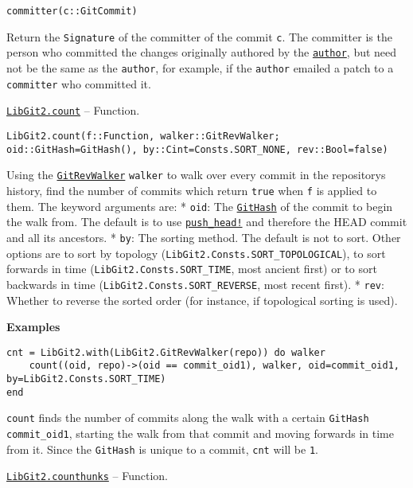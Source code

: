 \begin{adjustwidth}{2em}{0pt}


\begin{verbatim}
committer(c::GitCommit)
\end{verbatim}

Return the \texttt{Signature} of the committer of the commit \texttt{c}. The committer is the person who committed the changes originally authored by the \hyperlink{7024880280540966409}{\texttt{author}}, but need not be the same as the \texttt{author}, for example, if the \texttt{author} emailed a patch to a \texttt{committer} who committed it.



\end{adjustwidth}
\hypertarget{3202007276139600178}{} 
\hyperlink{3202007276139600178}{\texttt{LibGit2.count}}  -- {Function.}

\begin{adjustwidth}{2em}{0pt}


\begin{verbatim}
LibGit2.count(f::Function, walker::GitRevWalker; oid::GitHash=GitHash(), by::Cint=Consts.SORT_NONE, rev::Bool=false)
\end{verbatim}

Using the \hyperlink{7800294839307043628}{\texttt{GitRevWalker}} \texttt{walker} to {\textquotedbl}walk{\textquotedbl} over every commit in the repository{\textquotesingle}s history, find the number of commits which return \texttt{true} when \texttt{f} is applied to them. The keyword arguments are:     * \texttt{oid}: The \hyperlink{202290709580230708}{\texttt{GitHash}} of the commit to begin the walk from. The default is to use       \hyperlink{9792433728015067335}{\texttt{push\_head!}} and therefore the HEAD commit and all its ancestors.     * \texttt{by}: The sorting method. The default is not to sort. Other options are to sort by       topology (\texttt{LibGit2.Consts.SORT\_TOPOLOGICAL}), to sort forwards in time       (\texttt{LibGit2.Consts.SORT\_TIME}, most ancient first) or to sort backwards in time       (\texttt{LibGit2.Consts.SORT\_REVERSE}, most recent first).     * \texttt{rev}: Whether to reverse the sorted order (for instance, if topological sorting is used).

\textbf{Examples}


\begin{verbatim}
cnt = LibGit2.with(LibGit2.GitRevWalker(repo)) do walker
    count((oid, repo)->(oid == commit_oid1), walker, oid=commit_oid1, by=LibGit2.Consts.SORT_TIME)
end
\end{verbatim}

\texttt{count} finds the number of commits along the walk with a certain \texttt{GitHash} \texttt{commit\_oid1}, starting the walk from that commit and moving forwards in time from it. Since the \texttt{GitHash} is unique to a commit, \texttt{cnt} will be \texttt{1}.



\end{adjustwidth}
\hypertarget{14766056021243867485}{} 
\hyperlink{14766056021243867485}{\texttt{LibGit2.counthunks}}  -- {Function.}

